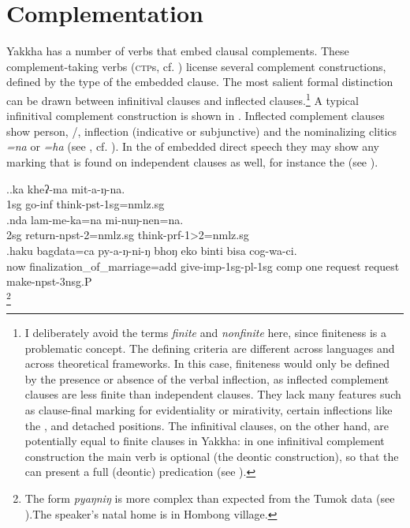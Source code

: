 \chapter{Complementation}\label{compl}

Yakkha has a number of  verbs that embed  clausal complements. These com\-ple\-ment-taking verbs (\textsc{ctp}s, cf. \citealt{Noonan2007Complementation}) license several complement constructions, defined by the type of the embedded clause. The most salient formal distinction can be drawn between infinitival clauses and inflected clauses.\footnote{I deliberately avoid the terms \emph{finite} and \emph{nonfinite} here, since finiteness is a problematic concept. The defining criteria are different across languages and across theoretical frameworks. In this case, finiteness would only be defined by the presence or absence of the verbal inflection, as inflected complement clauses are less finite than independent clauses. They lack many features such as clause-final marking for evidentiality or mirativity, certain  inflections like the , and detached positions. The infinitival clauses, on the other hand, are potentially equal to finite clauses in Yakkha: in one infinitival complement construction the main verb is optional (the deontic construction), so that the  can present a full (deontic) predication (see ).} A typical infinitival complement construction is shown in \Next[a]. Inflected complement clauses show person, /,  inflection (indicative  or subjunctive) and the nominalizing clitics \emph{=na} or \emph{=ha}  (see \Next[b], cf. ). In the  of embedded direct speech they may show any marking that is found on independent clauses as well, for instance the  (see \Next[c]). 

\ex.\ag.ka kheʔ-ma mit-a-ŋ-na.\\
{\sc 1sg} go{\sc -inf} think{\sc -pst-1sg=nmlz.sg}\\
\bg.nda lam-me-ka=na mi-nuŋ-nen=na.\\
{\sc 2sg} return{\sc -npst-2=nmlz.sg} think{\sc -prf-1>2=nmlz.sg}\\
\bg.haku bagdata=ca   py-a-ŋ-ni-ŋ  bhoŋ eko binti   bisa       cog-wa-ci.\\
now finalization\_of\_marriage{\sc =add} give{\sc -imp-1sg-pl-1sg} {\sc comp} one request request make{\sc -npst-3nsg.P}\\
\footnote{The form \emph{pyaŋniŋ} is more complex than expected from the Tumok data (see ).The speaker's natal home is in Hombong village.} 


